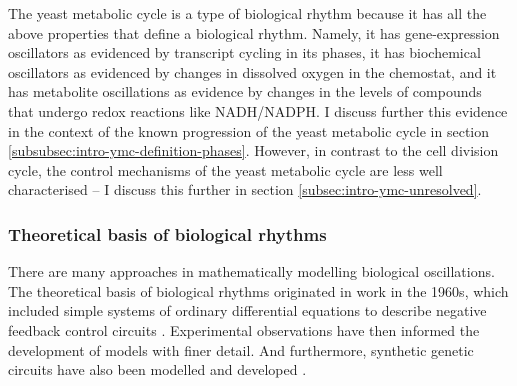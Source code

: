 The yeast metabolic cycle is a type of biological rhythm because it has all the above properties that define a biological rhythm.
Namely, it has gene-expression oscillators as evidenced by transcript cycling in its phases,
it has biochemical oscillators as evidenced by changes in dissolved oxygen in the chemostat,
and it has metabolite oscillations as evidence by changes in the levels of compounds that undergo redox reactions like NADH/NADPH.
I discuss further this evidence in the context of the known progression of the yeast metabolic cycle in section \ref{subsubsec:intro-ymc-definition-phases}.
However, in contrast to the cell division cycle, the control mechanisms of the yeast metabolic cycle are less well characterised -- I discuss this further in section \ref{subsec:intro-ymc-unresolved}.

\subsubsection{Theoretical basis of biological rhythms}
\label{subsubsec:intro-ymc-biological_rhythms-theoretical_basis}

There are many approaches in mathematically modelling biological oscillations.
The theoretical basis of biological rhythms originated in work in the 1960s, which included simple systems of ordinary differential equations to describe negative feedback control circuits \citep{goodwinOscillatoryBehaviorEnzymatic1965, griffithMathematicsCellularControl1968}.
Experimental observations have then informed the development of models with finer detail.
And furthermore, synthetic genetic circuits have also been modelled and developed \citep{elowitzSyntheticOscillatoryNetwork2000}.

